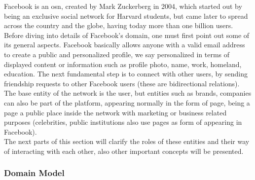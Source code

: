 Facebook is an \gls{osn}, created by Mark Zuckerberg in 2004, which started out by being an exclusive social network for Harvard students, but came later to spread across
the country and the globe, having today more than one billion users.\\
\indent Before diving into details of Facebook's domain, one must first point out some of its general aspects. Facebook basically allows anyone with a valid email address to create a public and personalized profile,
we say personalized in terms of displayed content or information such as profile photo, name, work, homeland, education.
The next fundamental step is to connect with other users, by sending friendship requests to other Facebook users (these are bidirectional relations).
The base entity of the network is the user, but entities such as brands, companies can also be part of the platform, appearing normally
in the form of page, being a page a public place inside the network with marketing or business related purposes (celebrities, public institutions also use pages as form of appearing in Facebook).\\
\indent The next parts of this section will clarify the roles of these entities and their way of interacting with each other, also other important concepts will be presented.

\subsubsection*{Domain Model}

